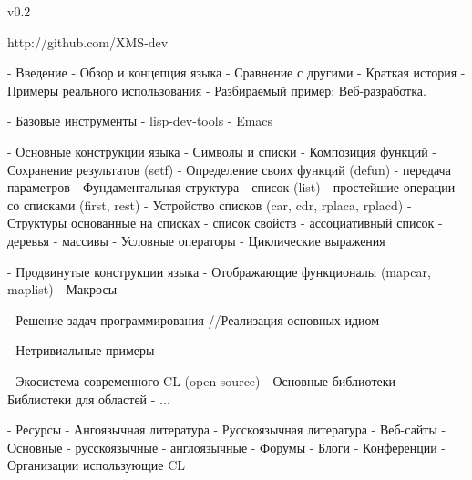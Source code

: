 v0.2

http://github.com/XMS-dev

- Введение
  - Обзор и концепция языка
  - Сравнение с другими
  - Краткая история
  - Примеры реального использования
    - Разбираемый пример: Веб-разработка.

- Базовые инструменты 
  - lisp-dev-tools\SBCL
  - Emacs\Slime

- Основные конструкции языка 
  - Символы и списки
  - Композиция функций
  - Сохранение результатов (setf)
  - Определение своих функций (defun)
    - передача параметров
  - Фундаментальная структура - список (list)
    - простейшие операции со списками (first, rest)
  - Устройство списков (car, cdr, rplaca, rplacd)
  - Структуры основанные на списках
    - список свойств
    - ассоциативный список
    - деревья
  - массивы
  - Условные операторы
  - Циклические выражения

- Продвинутые конструкции языка 
  - Отображающие функционалы (mapcar, maplist)
  - Макросы


- Решение задач программирования //Реализация основных идиом

- Нетривиальные примеры

- Экосистема современного CL (open-source)
  - Основные библиотеки
  - Библиотеки для областей
    - ...

- Ресурсы 
  - Ангоязычная литература
  - Русскоязычная литература
  - Веб-сайты
    - Основные
      - русскоязычные
      - англоязычные
    - Форумы 
    - Блоги
    - Конференции
  - Организации использующие CL
  
